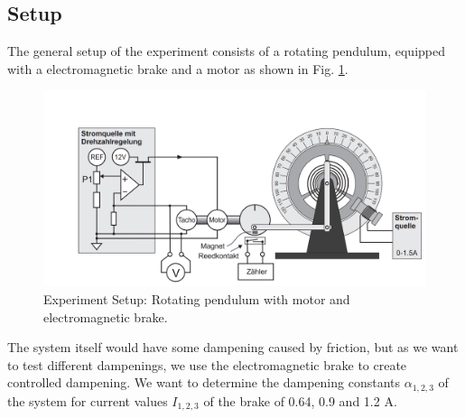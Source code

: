 \subsection{Setup}
The general setup of the experiment consists of a rotating pendulum, equipped with a electromagnetic brake and a motor as shown in Fig. \ref{fig::setup}.
\begin{figure} [ht]
	\centering
	\includegraphics[width=400pt]{img/setup.PNG}
	\caption{Experiment Setup: Rotating pendulum with motor and electromagnetic brake. \cite{manual}}
	\label{fig::setup}
\end{figure}

The system itself would have some dampening caused by friction, but as we want to test different dampenings, we use the electromagnetic brake to create controlled dampening.
We want to determine the dampening constants $\alpha_{1, 2, 3}$ of the system for current values $I_{1, 2, 3}$ of the brake of 0.64, 0.9 and 1.2 A.